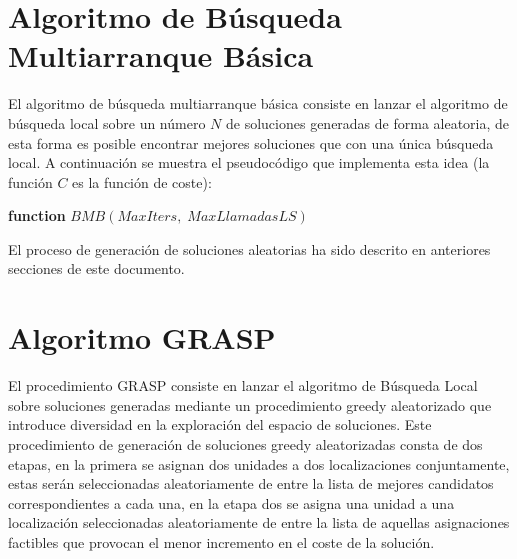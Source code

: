 \documentclass[11pt,a4paper]{article}
\begin{document}
\section{Algoritmo de Búsqueda Multiarranque Básica}

	\noindent El algoritmo de búsqueda multiarranque básica consiste en lanzar el algoritmo de búsqueda local sobre un número $N$ de soluciones generadas de forma aleatoria, de esta forma es posible encontrar mejores soluciones que con una única búsqueda local. A continuación se muestra el pseudocódigo que implementa esta idea (la función $C$ es la función de coste):
	
	\begin{algorithm}
		
		\textbf{function} $BMB(MaxIters,\;MaxLlamadasLS)$
		
	\end{algorithm}
	
	\noindent El proceso de generación de soluciones aleatorias ha sido descrito en anteriores secciones de este documento.
	
\clearpage

\section{Algoritmo GRASP}

	\noindent El procedimiento GRASP consiste en lanzar el algoritmo de Búsqueda Local sobre soluciones generadas mediante un procedimiento greedy aleatorizado que introduce diversidad en la exploración del espacio de soluciones. Este procedimiento de generación de soluciones greedy aleatorizadas consta de dos etapas, en la primera se asignan dos unidades a dos localizaciones conjuntamente, estas serán seleccionadas aleatoriamente de entre la lista de mejores candidatos correspondientes a cada una, en la etapa dos se asigna una unidad a una localización seleccionadas aleatoriamente de entre la lista de aquellas asignaciones factibles que provocan el menor incremento en el coste de la solución.\\
	
\end{document}
